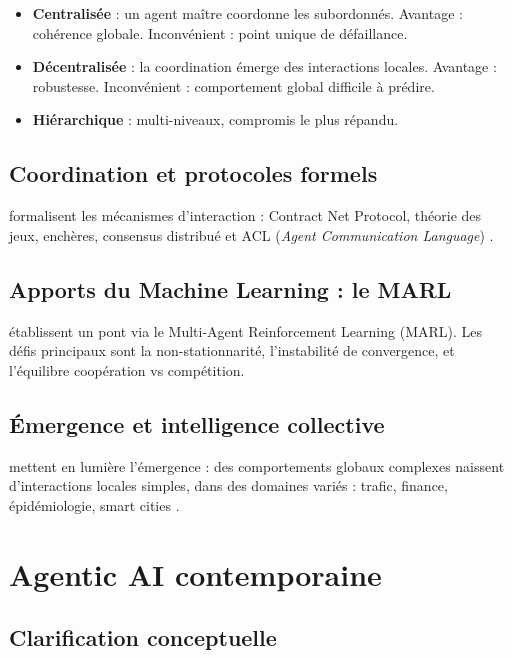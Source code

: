 \documentclass[12pt,a4paper]{report}
\begin{document}
\begin{itemize}
  \item \textbf{Centralisée} : un agent maître coordonne les subordonnés. Avantage :
        cohérence globale. Inconvénient : point unique de défaillance.
  \item \textbf{Décentralisée} : la coordination émerge des interactions locales.
        Avantage : robustesse. Inconvénient : comportement global difficile à prédire.
  \item \textbf{Hiérarchique} : multi-niveaux, compromis le plus répandu.
\end{itemize}

\subsection{Coordination et protocoles formels}

\citet{generalsurvey2020} formalisent les mécanismes d'interaction :
Contract Net Protocol, théorie des jeux, enchères, consensus distribué et
ACL (\textit{Agent Communication Language}) \citep{dorri2018}.

\subsection{Apports du Machine Learning : le MARL}

\citet{cmupaper2021} établissent un pont via le Multi-Agent Reinforcement Learning
(MARL). Les défis principaux sont la non-stationnarité, l'instabilité de convergence,
et l'équilibre coopération vs compétition.

\subsection{Émergence et intelligence collective}

\citet{visualsurvey2019} mettent en lumière l'émergence : des comportements globaux
complexes naissent d'interactions locales simples, dans des domaines variés : trafic,
finance, épidémiologie, smart cities \citep{wjarrpaper2024}.

\section{Agentic AI contemporaine}
\label{sec:agentic}

\subsection{Clarification conceptuelle}
\end{document}
